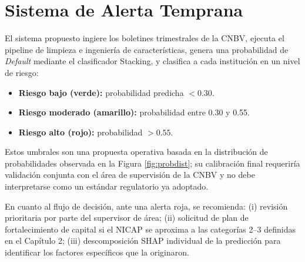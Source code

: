 \chapter{Sistema de Alerta Temprana}

El sistema propuesto ingiere los boletines trimestrales de la CNBV, ejecuta el pipeline de limpieza e ingeniería de características, genera una probabilidad de \textit{Default} mediante el clasificador Stacking, y clasifica a cada institución en un nivel de riesgo:
\begin{itemize}
    \item \textbf{Riesgo bajo (verde):} probabilidad predicha $<0.30$.
    \item \textbf{Riesgo moderado (amarillo):} probabilidad entre 0.30 y 0.55.
    \item \textbf{Riesgo alto (rojo):} probabilidad $>0.55$.
\end{itemize}
Estos umbrales son una propuesta operativa basada en la distribución de probabilidades observada en la Figura \ref{fig:probdist}; su calibración final requeriría validación conjunta con el área de supervisión de la CNBV y no debe interpretarse como un estándar regulatorio ya adoptado.

En cuanto al flujo de decisión, ante una alerta roja, se recomienda: (i) revisión prioritaria por parte del supervisor de área; (ii) solicitud de plan de fortalecimiento de capital si el NICAP se aproxima a las categorías 2--3 definidas en el Capítulo 2; (iii) descomposición SHAP individual de la predicción para identificar los factores específicos que la originaron.

